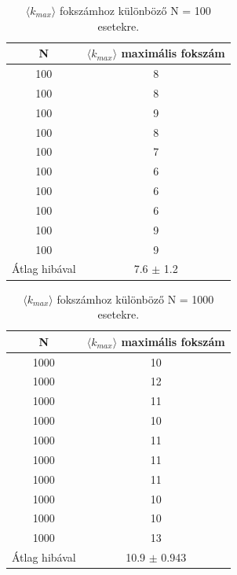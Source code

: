 \documentclass[a4paper, 12pt]{article}
\numberwithin{equation}{section}          %
\numberwithin{figure}{subsection}
\begin{document}
\begin{table}[ht!]
	\begin{center}
		\begin{tabular}{||c|c||}
			\hline
			N & $\langle k_{max} \rangle$ maximális fokszám \\  \hline
			100 & 8 \\	\hline
100 & 8 \\	\hline
100 & 9\\	\hline
100 & 8\\	\hline
100 & 7\\	\hline
100 & 6\\	\hline
100 & 6\\	\hline
100 & 6\\	\hline
100 & 9\\	\hline
100 & 9\\	\hline
			Átlag hibával & 7.6 $\pm$ 1.2\\  \hline
		\end{tabular}
		\caption{$\langle k_{max} \rangle$ fokszámhoz különböző N = 100 esetekre.}
	\end{center}
\end{table}


\begin{table}[ht!]
	\begin{center}
		\begin{tabular}{||c|c||}
			\hline
			N & $\langle k_{max} \rangle$ maximális fokszám \\  \hline
			1000 & 10 \\	\hline
			1000 & 12 \\	\hline
			1000 & 11\\	\hline
			1000 & 10\\	\hline
			1000 & 11\\	\hline
			1000 &11\\	\hline
			1000 & 11\\	\hline
			1000 & 10\\	\hline
			1000 & 10\\	\hline
			1000 & 13\\	\hline
			Átlag hibával & 10.9 $\pm$ 0.943\\  \hline
		\end{tabular}
		\caption{$\langle k_{max} \rangle$ fokszámhoz különböző N = 1000 esetekre.}
	\end{center}
\end{table}
\end{document}
